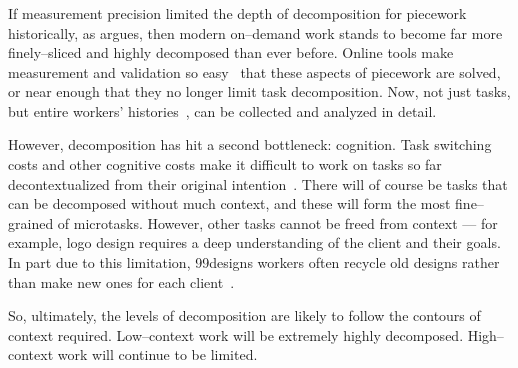 \documentclass[trackingWork]{subfiles}
\begin{document}
\onlyinsubfile{\newpage}
\subsubsection{\implication}
If measurement precision limited the depth of decomposition for piecework historically,
as \citeauthor{10.2307/23702539} argues,
then modern on--demand work stands to become far more finely--sliced and highly decomposed than ever before.
Online tools make measurement and validation so easy~\cite{rzeszotarski2011instrumenting} that these aspects of piecework are solved,
or near enough that they no longer limit task decomposition.
Now,
not just tasks,
but entire workers' histories~\cite{hata2017glimpse},
can be collected and analyzed in detail.

However,
decomposition has hit a second bottleneck: cognition. 
Task switching costs and other cognitive costs make it difficult
to work on tasks so far decontextualized from their original intention~\cite{delayAndOrderLasecki}.
There will of course be tasks that can be decomposed without much context,
and these will form the most fine--grained of microtasks.
However, other tasks cannot be freed from context
--- for example,
logo design requires a deep understanding of the client and their goals.
In part due to this limitation,
99designs workers often recycle old designs rather than make new ones for each client~\cite{araujo201399designs}.

So,
ultimately,
the levels of decomposition are likely to follow the contours of context required.
Low--context work will be extremely highly decomposed.
High--context work will continue to be limited.


\onlyinsubfile{
  \balance{}
  \printbibliography
}
\end{document}
